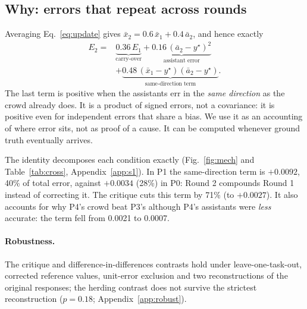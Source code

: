 \documentclass[10pt]{article}
\theoremstyle{manuscript}\newtheorem{proposition}{Proposition}
\begin{document}
\subsection{Why: errors that repeat across rounds}\label{sec:mech}
Averaging Eq.~\eqref{eq:update} gives $\bar x_2=0.6\,\bar x_1+0.4\,\bar a_2$, and hence exactly
\begin{equation}\label{eq:cross}
\begin{aligned}
E_2={}&\underbrace{0.36\,E_1}_{\text{carry-over}}
      +\underbrace{0.16\,(\bar a_2-y^\star)^2}_{\text{assistant error}}\\[3pt]
     &+\underbrace{0.48\,(\bar x_1-y^\star)(\bar a_2-y^\star)}_{\text{same-direction term}} .
\end{aligned}
\end{equation}
The last term is positive when the assistants err in the \emph{same direction} as the crowd already does. It is a product of signed errors, not a covariance: it is positive even for independent errors that share a bias. We use it as an accounting of where error sits, not as proof of a cause. It can be computed whenever ground truth eventually arrives.



The identity decomposes each condition exactly (Fig.~\ref{fig:mech} and Table~\ref{tab:cross}, Appendix~\ref{app:s1}). In P1 the same-direction term is $+0.0092$, 40\% of total error, against $+0.0034$ (28\%) in P0: Round 2 compounds Round 1 instead of correcting it. The critique cuts this term by 71\% (to $+0.0027$). It also accounts for why P4's crowd beat P3's although P4's assistants were \emph{less} accurate: the term fell from 0.0021 to 0.0007.

\paragraph{Robustness.} The critique and difference-in-differences contrasts hold under leave-one-task-out, corrected reference values, unit-error exclusion and two reconstructions of the original responses; the herding contrast does not survive the strictest reconstruction ($p=0.18$; Appendix~\ref{app:robust}).
\end{document}
